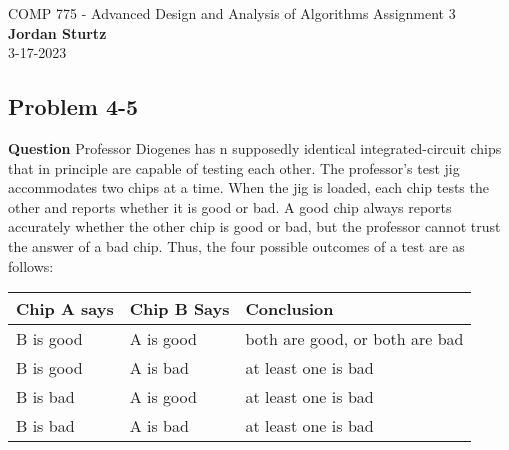 \documentclass[]{book}
\theoremstyle{definition}
\begin{document}
\begin{center}
{\Large COMP 775 - Advanced Design and Analysis of Algorithms \hspace{0.5cm} Assignment 3}\\
\textbf{Jordan Sturtz}\\ %
3-17-2023 %
\end{center}

\vspace{0.2 cm}

\subsection*{Problem 4-5}

\textbf{Question} 
Professor Diogenes has n supposedly identical integrated-circuit chips that in principle are capable of testing each other. 
The professor’s test jig accommodates two
chips at a time. When the jig is loaded, each chip tests the other and reports whether
it is good or bad. A good chip always reports accurately whether the other chip is
good or bad, but the professor cannot trust the answer of a bad chip. Thus, the four
possible outcomes of a test are as follows:

\begin{table}[H]
\captionsetup{labelfont=it,justification=centering} 		%
\begin{tabular}{l l l} %
    \textbf{Chip A says} & \textbf{Chip B Says} & \textbf{Conclusion}
    \tabularnewline\hline
    B is good        & A is good & both are good, or both are bad
    \tabularnewline
    B is good        & A is bad & at least one is bad
    \tabularnewline
    B is bad        & A is good & at least one is bad
    \tabularnewline
    B is bad        & A is bad & at least one is bad
    \tabularnewline
\end{tabular}
\end{table}
\end{document}
